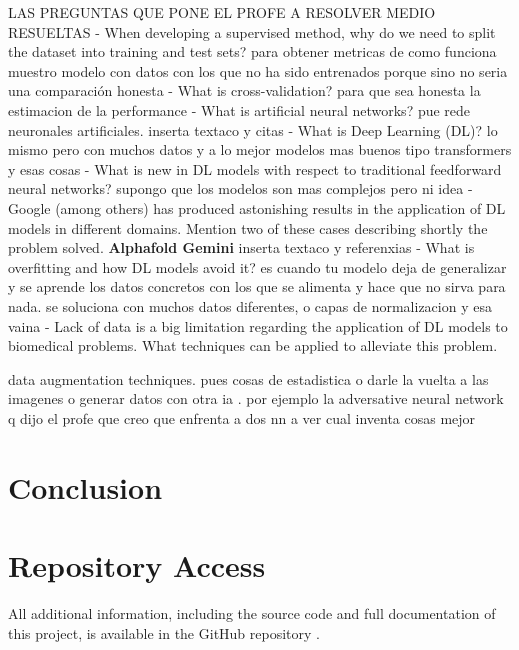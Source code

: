\documentclass{article}
\begin{document}
LAS PREGUNTAS QUE PONE EL PROFE A RESOLVER MEDIO RESUELTAS
- When developing a supervised method, why do we need to split the dataset into training and test sets? para obtener metricas de como funciona muestro modelo con datos con los que no ha sido entrenados porque sino no seria una comparación honesta
- What is cross-validation? para que sea honesta la estimacion de la performance
- What is artificial neural networks? pue rede neuronales artificiales. inserta textaco y citas
- What is Deep Learning (DL)? lo mismo pero con muchos datos y a lo mejor modelos mas buenos tipo transformers  y esas cosas
- What is new in DL models with respect to traditional feedforward neural networks? supongo que los modelos son mas complejos pero ni idea
- Google (among others) has produced astonishing results in the 
application of DL models in different domains. Mention two of these cases describing shortly the problem solved. \textbf{Alphafold Gemini} inserta textaco y referenxias
- What is overfitting and how DL models avoid it? es cuando tu modelo deja de generalizar y se aprende los datos concretos con los que se alimenta y hace que no sirva para nada. se soluciona con muchos datos diferentes, o capas de normalizacion y esa vaina
- Lack of data is a big limitation regarding the application of DL 
models to biomedical problems. What techniques can be applied 
to alleviate this problem.

data augmentation techniques. pues cosas de estadistica o darle la vuelta a las imagenes o generar datos con otra ia . por ejemplo la adversative neural network q dijo el profe que creo que enfrenta a dos nn a ver cual inventa cosas mejor
\section{Conclusion}


\section{Repository Access}

All additional information, including the source code and full documentation of this project, is available in the GitHub repository \cite{cuevas2024github}.


\end{document}
